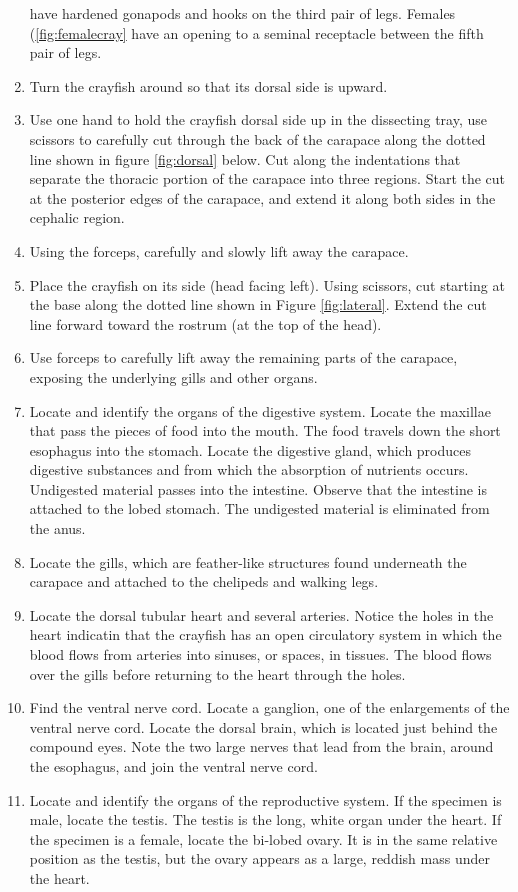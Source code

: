 \documentclass[]{book}
\theoremstyle{definition}
\theoremstyle{definition}
\theoremstyle{definition}
\theoremstyle{remark}
\begin{document}
\begin{enumerate}
  have hardened gonapods and hooks on the third pair of legs. Females
  (\ref{fig:femalecray} have an opening to a seminal receptacle between
  the fifth pair of legs.
\item
  Turn the crayfish around so that its dorsal side is upward.
\item
  Use one hand to hold the crayfish dorsal side up in the dissecting
  tray, use scissors to carefully cut through the back of the carapace
  along the dotted line shown in figure \ref{fig:dorsal} below. Cut
  along the indentations that separate the thoracic portion of the
  carapace into three regions. Start the cut at the posterior edges of
  the carapace, and extend it along both sides in the cephalic region.
\item
  Using the forceps, carefully and slowly lift away the carapace.
\item
  Place the crayfish on its side (head facing left). Using scissors, cut
  starting at the base along the dotted line shown in Figure
  \ref{fig:lateral}. Extend the cut line forward toward the rostrum (at
  the top of the head).
\item
  Use forceps to carefully lift away the remaining parts of the
  carapace, exposing the underlying gills and other organs.
\item
  Locate and identify the organs of the digestive system. Locate the
  maxillae that pass the pieces of food into the mouth. The food travels
  down the short esophagus into the stomach. Locate the digestive gland,
  which produces digestive substances and from which the absorption of
  nutrients occurs. Undigested material passes into the intestine.
  Observe that the intestine is attached to the lobed stomach. The
  undigested material is eliminated from the anus.
\item
  Locate the gills, which are feather-like structures found underneath
  the carapace and attached to the chelipeds and walking legs.
\item
  Locate the dorsal tubular heart and several arteries. Notice the holes
  in the heart indicatin that the crayfish has an open circulatory
  system in which the blood flows from arteries into sinuses, or spaces,
  in tissues. The blood flows over the gills before returning to the
  heart through the holes.
\item
  Find the ventral nerve cord. Locate a ganglion, one of the
  enlargements of the ventral nerve cord. Locate the dorsal brain, which
  is located just behind the compound eyes. Note the two large nerves
  that lead from the brain, around the esophagus, and join the ventral
  nerve cord.
\item
  Locate and identify the organs of the reproductive system. If the
  specimen is male, locate the testis. The testis is the long, white
  organ under the heart. If the specimen is a female, locate the
  bi-lobed ovary. It is in the same relative position as the testis, but
  the ovary appears as a large, reddish mass under the heart.
\end{enumerate}
\end{document}
